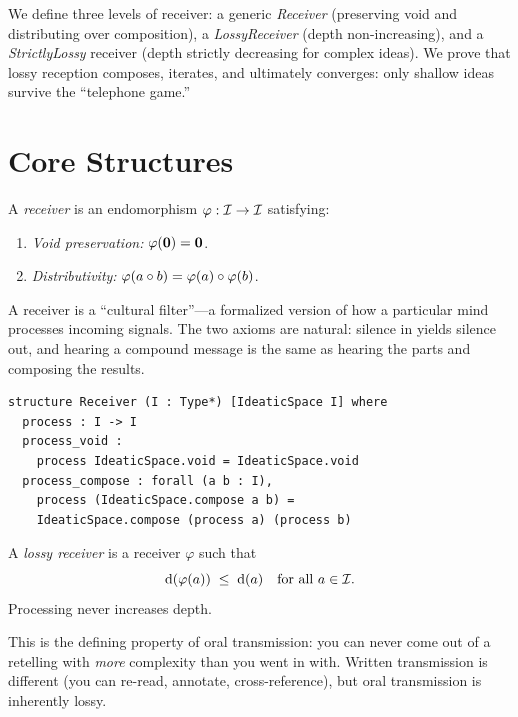 We define three levels of receiver: a generic \emph{Receiver} (preserving
void and distributing over composition), a \emph{LossyReceiver} (depth
non-increasing), and a \emph{StrictlyLossy} receiver (depth strictly
decreasing for complex ideas).  We prove that lossy reception composes,
iterates, and ultimately converges: only shallow ideas survive the
``telephone game.''


\section{Core Structures}
\label{sec:lossy-defs}

\begin{definition}[Receiver]
\label{def:receiver}
A \emph{receiver} is an endomorphism $\varphi:\mathcal{I}\to\mathcal{I}$ satisfying:
\begin{enumerate}
  \item \emph{Void preservation:} $\varphi(\mathbf{0}) = \mathbf{0}$.
  \item \emph{Distributivity:} $\varphi(a\circ b) = \varphi(a)\circ\varphi(b)$.
\end{enumerate}
\end{definition}

A receiver is a ``cultural filter''---a formalized version of how a
particular mind processes incoming signals.  The two axioms are natural:
silence in yields silence out, and hearing a compound message is the same
as hearing the parts and composing the results.

\begin{lstlisting}[caption={The Receiver structure in Lean~4.}]
structure Receiver (I : Type*) [IdeaticSpace I] where
  process : I -> I
  process_void :
    process IdeaticSpace.void = IdeaticSpace.void
  process_compose : forall (a b : I),
    process (IdeaticSpace.compose a b) =
    IdeaticSpace.compose (process a) (process b)
\end{lstlisting}

\begin{definition}
\label{def:lossy-receiver}
A \emph{lossy receiver} is a receiver $\varphi$ such that
\[
  \operatorname{d}(\varphi(a)) \;\le\; \operatorname{d}(a) \quad\text{for all } a\in\mathcal{I}.
\]
Processing never increases depth.
\end{definition}

This is the defining property of oral transmission: you can never come out
of a retelling with \emph{more} complexity than you went in with.  Written
transmission is different (you can re-read, annotate, cross-reference), but
oral transmission is inherently lossy.

